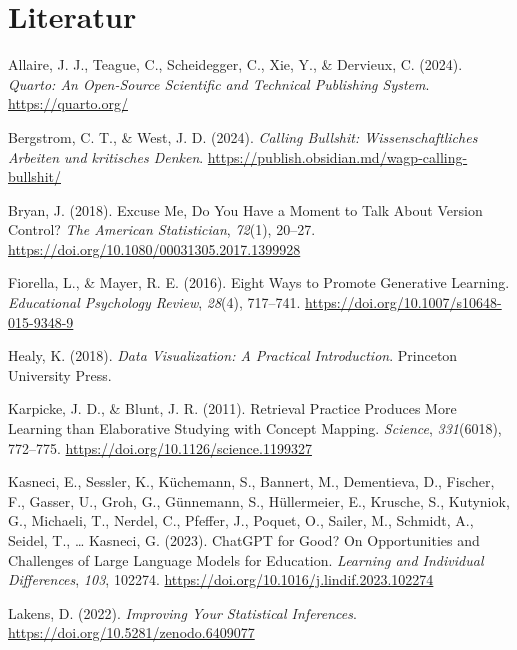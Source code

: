 \documentclass[
  ngerman,
  a4paper,
  DIV=11]{scrreprt}
\newlength{\cslhangindent}
\newenvironment{CSLReferences}[2] %
 {\begin{list}{}{%
  \setlength{\itemindent}{0pt}
  \setlength{\leftmargin}{0pt}
  \setlength{\parsep}{0pt}
  \ifodd #1
   \setlength{\leftmargin}{\cslhangindent}
   \setlength{\itemindent}{-1\cslhangindent}
  \fi
  \setlength{\itemsep}{#2\baselineskip}}}
 {\end{list}}
\begin{document}
\chapter*{Literatur}\label{literatur-5}


\label{refs}
\begin{CSLReferences}{1}{0}
Allaire, J. J., Teague, C., Scheidegger, C., Xie, Y., \& Dervieux, C.
(2024). \emph{Quarto: An Open-Source Scientific and Technical Publishing
System}. \url{https://quarto.org/}

Bergstrom, C. T., \& West, J. D. (2024). \emph{Calling Bullshit:
Wissenschaftliches Arbeiten und kritisches Denken}.
\url{https://publish.obsidian.md/wagp-calling-bullshit/}

Bryan, J. (2018). Excuse Me, Do You Have a Moment to Talk About Version
Control? \emph{The American Statistician}, \emph{72}(1), 20--27.
\url{https://doi.org/10.1080/00031305.2017.1399928}

Fiorella, L., \& Mayer, R. E. (2016). Eight Ways to Promote Generative
Learning. \emph{Educational Psychology Review}, \emph{28}(4), 717--741.
\url{https://doi.org/10.1007/s10648-015-9348-9}

Healy, K. (2018). \emph{Data Visualization: A Practical Introduction}.
Princeton University Press.

Karpicke, J. D., \& Blunt, J. R. (2011). Retrieval Practice Produces
More Learning than Elaborative Studying with Concept Mapping.
\emph{Science}, \emph{331}(6018), 772--775.
\url{https://doi.org/10.1126/science.1199327}

Kasneci, E., Sessler, K., Küchemann, S., Bannert, M., Dementieva, D.,
Fischer, F., Gasser, U., Groh, G., Günnemann, S., Hüllermeier, E.,
Krusche, S., Kutyniok, G., Michaeli, T., Nerdel, C., Pfeffer, J.,
Poquet, O., Sailer, M., Schmidt, A., Seidel, T., \ldots{} Kasneci, G.
(2023). {ChatGPT} for Good? On Opportunities and Challenges of Large
Language Models for Education. \emph{Learning and Individual
Differences}, \emph{103}, 102274.
\url{https://doi.org/10.1016/j.lindif.2023.102274}

Lakens, D. (2022). \emph{Improving Your Statistical Inferences}.
\url{https://doi.org/10.5281/zenodo.6409077}


\end{CSLReferences}
\end{document}
